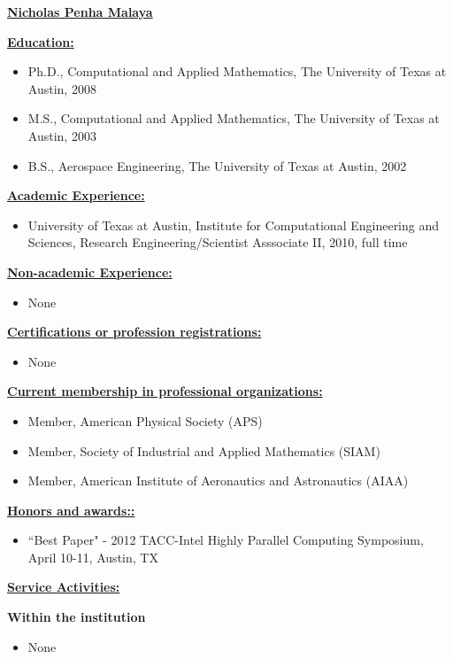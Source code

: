 \documentclass[12pt]{article}
\newcommand{\makeheading}[1]%
        {\hspace*{-\marginparsep minus \marginparwidth}%
         	\begin{center}
                {\underline{\bfseries #1}}\\%
                 \end{center}
         }
\newcommand{\makesection}[1]{\underline{\bfseries #1:}}
\begin{document}
\makeheading{Nicholas Penha Malaya}

\makesection{Education}
\begin{itemize}
\item Ph.D., Computational and Applied Mathematics, The University of Texas at Austin, 2008
\item M.S., Computational and Applied Mathematics, The University of Texas at Austin, 2003
\item B.S., Aerospace Engineering, The University of Texas at Austin, 2002
\end{itemize}

\makesection{Academic Experience}
\begin{itemize}
\item University of Texas at Austin, Institute for Computational Engineering and Sciences,
Research Engineering/Scientist Asssociate II, 2010, full time
\end{itemize}

\makesection{Non-academic Experience}
\begin{itemize}
\item None
\end{itemize}

\makesection{Certifications or profession registrations}
\begin{itemize}
\item None
\end{itemize}

\makesection{Current membership in professional organizations}
\begin{itemize}
\item Member, American Physical Society (APS)
\item Member, Society of Industrial and Applied Mathematics (SIAM)
\item Member, American Institute of Aeronautics and Astronautics (AIAA)
\end{itemize}

\makesection{Honors and awards:}
\begin{itemize}
\item ``Best Paper" - 2012 TACC-Intel Highly Parallel Computing Symposium, April 10-11, Austin, TX
\end{itemize}

\makesection{Service Activities}

\textbf{Within the institution}
\begin{itemize}
\item None
\end{itemize}
\end{document}
